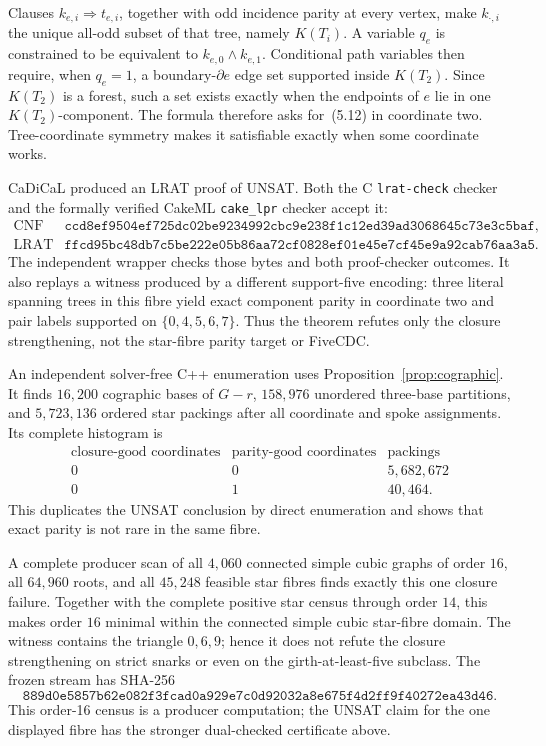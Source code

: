 \documentclass[11pt]{article}
\theoremstyle{definition}
\theoremstyle{remark}
\newcommand{\1}{\mathbf 1}
\begin{document}
Clauses \(k_{e,i}\Rightarrow t_{e,i}\), together with odd incidence
parity at every vertex, make \(k_{\cdot,i}\) the unique all-odd subset
of that tree, namely \(K(T_i)\).  A variable \(q_e\) is constrained to
be equivalent to \(k_{e,0}\wedge k_{e,1}\).  Conditional path variables
then require, when \(q_e=1\), a boundary-\(\partial e\) edge set supported
inside \(K(T_2)\).  Since \(K(T_2)\) is a forest, such a set exists
exactly when the endpoints of \(e\) lie in one \(K(T_2)\)-component.
The formula therefore asks for~(5.12) in coordinate two.  Tree-coordinate
symmetry makes it satisfiable exactly when some coordinate works.

CaDiCaL produced an LRAT proof of UNSAT.  Both the C
\texttt{lrat-check} checker and the formally verified CakeML
\texttt{cake\_lpr} checker accept it:
\[
\begin{array}{ll}
\text{CNF SHA-256}&
\texttt{ccd8ef9504ef725dc02be9234992cbc9e238f1c12ed39ad3068645c73e3c5baf},\\
\text{LRAT SHA-256}&
\texttt{ffcd95bc48db7c5be222e05b86aa72cf0828ef01e45e7cf45e9a92cab76aa3a5}.
\end{array}                                             \tag{6.12}
\]
The independent wrapper checks those bytes and both proof-checker
outcomes.  It also replays a witness produced by a different support-five
encoding: three literal spanning trees in this fibre yield exact
component parity in coordinate two and pair labels supported on
\(\{0,4,5,6,7\}\).  Thus the theorem refutes only the closure
strengthening, not the star-fibre parity target or FiveCDC.

An independent solver-free C++ enumeration uses
Proposition~\ref{prop:cographic}.  It finds \(16{,}200\) cographic bases
of \(G-r\), \(158{,}976\) unordered three-base partitions, and
\(5{,}723{,}136\) ordered star packings after all coordinate and spoke
assignments.  Its complete histogram is
\[
\begin{array}{c|c|r}
\text{closure-good coordinates}&\text{parity-good coordinates}
 &\text{packings}\\ \hline
0&0&5{,}682{,}672\\
0&1&40{,}464.
\end{array}                                             \tag{6.13}
\]
This duplicates the UNSAT conclusion by direct enumeration and shows
that exact parity is not rare in the same fibre.

A complete producer scan of all \(4{,}060\) connected simple cubic graphs
of order \(16\), all \(64{,}960\) roots, and all \(45{,}248\) feasible
star fibres finds exactly this one closure failure.  Together with the
complete positive star census through order \(14\), this makes order \(16\)
minimal within the connected simple cubic star-fibre domain.  The witness
contains the triangle \(0,6,9\); hence it does not refute the closure
strengthening on strict snarks or even on the girth-at-least-five subclass.
The frozen stream has SHA-256
\[
\texttt{889d0e5857b62e082f3fcad0a929e7c0d92032a8e675f4d2ff9f40272ea43d46}.
\]
This order-16 census is a producer computation; the UNSAT claim for the one
displayed fibre has the stronger dual-checked certificate above.
\end{document}
